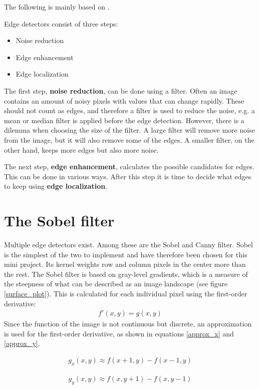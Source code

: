 The following is mainly based on \citep{edge_lecture}.

Edge detectors consist of three steps:
\begin{itemize}
\item Noise reduction
\item Edge enhancement
\item Edge localization
\end{itemize}

The first step, \textbf{noise reduction}, can be done using a filter. Often an image contains an amount of noisy pixels with values that can change rapidly. These should not count as edges, and therefore a filter is used to reduce the noise, e.g. a mean or median filter is applied before the edge detection. However, there is a dilemma when choosing the size of the filter. A large filter will remove more noise from the image, but it will also remove some of the edges. A smaller filter, on the other hand, keeps more edges but also more noise.

The next step, \textbf{edge enhancement}, calculates the possible candidates for edges. This can be done in various ways. After this step it is time to decide what edges to keep using \textbf{edge localization}.

\section{The Sobel filter}
Multiple edge detectors exist. Among these are the Sobel and Canny filter. Sobel is the simplest of the two to implement and have therefore been chosen for this mini project. Its kernel weights row and column pixels in the center more than the rest. The Sobel filter is based on gray-level gradients, which is a measure of the steepness of what can be described as an image landscape (see figure \ref{surface_plot}). This is calculated for each individual pixel using the first-order derivative: \begin{align}f'(x,y) = g(x,y)\nonumber \end{align}
Since the function of the image is not continuous but discrete, an approximation is used for the first-order derivative, as shown in equations \ref{approx_x} and \ref{approx_y}.

\begin{align}
g_x(x,y) \approx f(x+1,y)-f(x-1,y)
\label{approx_x}
\end{align}

\begin{align}
g_y(x,y) \approx f(x, y+1)-f(x,y-1)
\label{approx_y}
\end{align}

